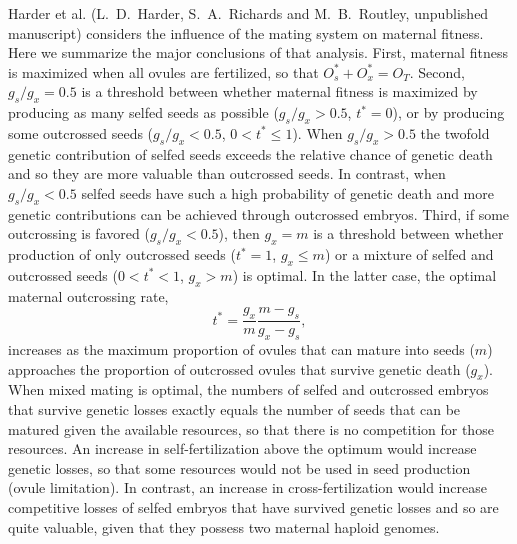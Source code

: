 \documentclass[letterpaper,titlepage]{scrartcl}
\newcommand{\OFMixedMating}{L.~D.~Harder, S.~A.~Richards and
  M.~B.~Routley, unpublished manuscript}
\begin{document}
Harder et al. ({\OFMixedMating}) considers the influence of the mating
system on maternal fitness. Here we summarize the major conclusions of
that analysis. First, maternal fitness is maximized when all ovules
are fertilized, so that $O_{s}^{*}+O_{x}^{*}=O_{T}$. Second,
$g_{s}/g_{x}=0.5$ is a threshold between whether maternal fitness is
maximized by producing as many selfed seeds as possible
($g_{s}/g_{x}>0.5$, $t^{*}=0$), or by producing some outcrossed seeds
($g_{s}/g_{x}<0.5$, $0<t^{*}\leqslant 1$). When $g_{s}/g_{x}>0.5$ the
twofold genetic contribution of selfed seeds exceeds the relative
chance of genetic death and so they are more valuable than outcrossed
seeds. In contrast, when $g_{s}/g_{x}<0.5$ selfed seeds have such a
high probability of genetic death and more genetic contributions can
be achieved through outcrossed embryos. Third, if some outcrossing is
favored ($g_{s}/g_{x}<0.5$), then $g_{x}=m$ is a threshold between
whether production of only outcrossed seeds ($t^{*}=1$,
$g_{x}\leqslant m$) or a mixture of selfed and outcrossed seeds
($0<t^{*}<1$, $g_{x}>m$) is optimal. In the latter case, the optimal
maternal outcrossing rate,
\begin{equation}\label{eq:mixedMating}
  t^{*}=\frac{g_{x}}{m}\frac{m-g_{s}}{g_{x}-g_{s}},
\end{equation}
increases as the maximum proportion of ovules that can mature into
seeds ($m$) approaches the proportion of outcrossed ovules that
survive genetic death ($g_{x}$). When mixed mating is optimal, the
numbers of selfed and outcrossed embryos that survive genetic losses
exactly equals the number of seeds that can be matured given the
available resources, so that there is no competition for those
resources. An increase in self-fertilization above the optimum would
increase genetic losses, so that some resources would not be used in
seed production (ovule limitation). In contrast, an increase in
cross-fertilization would increase competitive losses of selfed
embryos that have survived genetic losses and so are quite valuable,
given that they possess two maternal haploid genomes.
\end{document}
